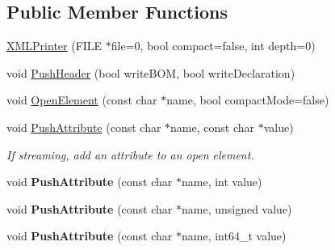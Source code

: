 \subsection*{Public Member Functions}
\begin{DoxyCompactItemize}
\item 
\hyperlink{classCPlantBox_1_1tinyxml2_1_1XMLPrinter_ab31ece6c12115fabe27d96dec3fcbc12}{X\+M\+L\+Printer} (F\+I\+LE $\ast$file=0, bool compact=false, int depth=0)
\item 
void \hyperlink{classCPlantBox_1_1tinyxml2_1_1XMLPrinter_a25cb903976aa0a0c6c0d11c8b57eba4c}{Push\+Header} (bool write\+B\+OM, bool write\+Declaration)
\item 
void \hyperlink{classCPlantBox_1_1tinyxml2_1_1XMLPrinter_aa797e20ece518c0e53b41150f6529cd8}{Open\+Element} (const char $\ast$name, bool compact\+Mode=false)
\item 
\mbox{\label{classCPlantBox_1_1tinyxml2_1_1XMLPrinter_a082496db688dda8fa393a3a409ae5be6}} 
void \hyperlink{classCPlantBox_1_1tinyxml2_1_1XMLPrinter_a082496db688dda8fa393a3a409ae5be6}{Push\+Attribute} (const char $\ast$name, const char $\ast$value)
\begin{DoxyCompactList}\small\item\em If streaming, add an attribute to an open element. \end{DoxyCompactList}\item 
\mbox{\label{classCPlantBox_1_1tinyxml2_1_1XMLPrinter_ac53e42f02c71e0d230d592fb83da7231}} 
void {\bfseries Push\+Attribute} (const char $\ast$name, int value)
\item 
\mbox{\label{classCPlantBox_1_1tinyxml2_1_1XMLPrinter_a8cdf584f74145dafe841a1b3daf7de46}} 
void {\bfseries Push\+Attribute} (const char $\ast$name, unsigned value)
\item 
\mbox{\label{classCPlantBox_1_1tinyxml2_1_1XMLPrinter_a10a5369435b39c15b413845deab2cf1f}} 
void {\bfseries Push\+Attribute} (const char $\ast$name, int64\+\_\+t value)
\item 
\mbox{\label{classCPlantBox_1_1tinyxml2_1_1XMLPrinter_a4aea10852ab79204f0d22cf77ff16ad4}} 

\end{DoxyCompactItemize}
